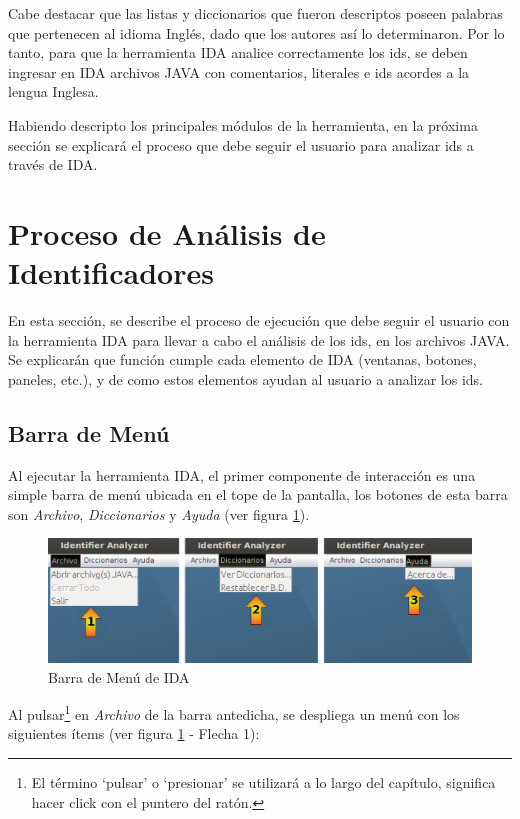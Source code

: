 Cabe destacar que las listas y diccionarios que fueron descriptos poseen palabras que pertenecen al idioma Inglés, dado que los autores así lo determinaron. Por lo tanto, para que la herramienta IDA analice correctamente los ids, se deben ingresar en IDA archivos JAVA con comentarios, literales e ids acordes a la lengua Inglesa. 

Habiendo descripto los principales módulos de la herramienta, en la próxima sección se explicará el proceso que debe seguir el usuario para analizar ids a través de IDA.
 
\section{Proceso de Análisis de Identificadores}

En esta sección, se describe el proceso de ejecución que debe seguir el usuario con la herramienta IDA para llevar a cabo el análisis de los ids, en los archivos JAVA. Se explicarán que función cumple cada elemento de IDA (ventanas, botones, paneles, etc.), y de como estos elementos ayudan al usuario a analizar los ids.

\subsection{Barra de Menú}

Al ejecutar la herramienta IDA, el primer componente de interacción es una simple barra de menú ubicada en el tope de la pantalla, los botones de esta barra son \textit{Archivo}, \textit{Diccionarios} y \textit{Ayuda} (ver figura \ref{ida1}). 

\begin{figure}[t] %
\centerline{%
\includegraphics[scale= 0.46]{./cap4/ida_01.png}
}
\caption{Barra de Menú de IDA}
\label{ida1}
\end{figure}

Al pulsar\footnote[1]{El término `pulsar' o `presionar' se utilizará a lo largo del capítulo, significa hacer click con el puntero del ratón.} en \textit{Archivo} de la barra antedicha, se despliega un menú con los siguientes ítems (ver figura \ref{ida1} - Flecha 1):

